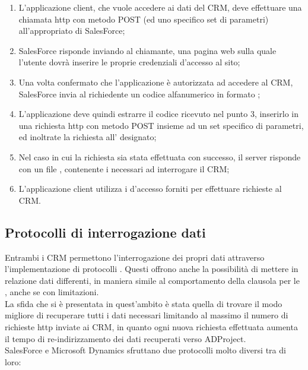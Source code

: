 \documentclass[12pt,a4paper,twoside,openany,english]{book}
\begin{document}
			\begin{enumerate}
				\item L'applicazione client, che vuole accedere ai dati del \gls{CRM}, deve effettuare una chiamata \gls{http} con metodo POST (ed uno specifico set di parametri) all'appropriato  di SalesForce;
				\item SalesForce risponde inviando al chiamante, una pagina web sulla quale l'utente dovrà inserire le proprie credenziali d'accesso al sito; %
				\item Una volta confermato che l'applicazione è autorizzata ad accedere al \gls{CRM}, SalesForce invia al richiedente un codice alfanumerico in formato ;
				\item L'applicazione deve quindi estrarre il codice ricevuto nel punto 3, inserirlo in una richiesta \gls{http} con metodo POST insieme ad un set specifico di parametri, ed inoltrate la richiesta all' designato;
				\item Nel caso in cui la richiesta sia stata effettuata con successo, il server risponde con un file , contenente i  necessari ad interrogare il \gls{CRM};
				\item L'applicazione client utilizza i  d'accesso forniti per effettuare richieste al \gls{CRM}. 
			\end{enumerate}
		\subsection{Protocolli di interrogazione dati}
			Entrambi i \gls{CRM} permettono l'interrogazione dei propri dati attraverso l'implementazione di protocolli \textit{}. Questi offrono anche la possibilità di mettere in relazione dati differenti, in maniera simile al comportamento della clausola  per le  , anche se con limitazioni.\\ 
			La sfida che si è presentata in quest'ambito è stata quella di trovare il modo migliore di recuperare tutti i dati necessari limitando al massimo il numero di richieste \gls{http} inviate ai \gls{CRM}, in quanto ogni nuova richiesta effettuata aumenta il tempo di re-indirizzamento dei dati recuperati verso ADProject.
			~\\
			SalesForce e Microsoft Dynamics sfruttano due protocolli molto diversi tra di loro:
\end{document}
